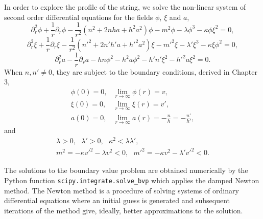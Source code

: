 In order to explore the profile of the string, we solve the non-linear system of second order differential equations for the fields $\phi$, $\xi$ and $a$, 
\begin{equation}
	\partial_r^2 \phi + \frac{1}{r} \partial_r \phi- \frac{1}{r^2}\left(n^2+2nha+h^2a^2\right)\phi- m^2 \phi- \lambda \phi^3-\kappa \phi \xi^2 = 0,
\end{equation}
\begin{equation}
	\partial_r^2 \xi + \frac{1}{r} \partial_r \xi - \frac{1}{r^2}\left(n'^2+2n'h' a+h'^2a^2 \right)\xi -m'^2\xi - \lambda' \xi^3 - \kappa \xi \phi^2 = 0 ,
\end{equation}
\begin{equation}
	\partial_r^2a -\frac{1}{r}\partial_r a-hn\phi^2-h^2a\phi^2-h' n'\xi^2 - h'^2 a \xi^2 = 0.  
\end{equation}
When $n,n'\neq 0$, they are subject to the boundary conditions, derived in Chapter 3,
\begin{eqnarray}
	\phi(0)=0, & \displaystyle\lim_{r\to\infty}\phi(r) = v, \nonumber \\
	 \xi(0)=0, &  \displaystyle\lim_{r\to\infty}\xi(r) = v', \nonumber  \\
	 a(0)=0, & \displaystyle \lim_{r\to\infty}a(r) = -\frac{n}{h}=-\frac{n'}{h'},
\end{eqnarray}
and
\begin{align}
	\label{eq:constraints}
	\lambda>0, \ \ \ \lambda'>0, \ \ \ \kappa^2 < \lambda \lambda',\nonumber \\
	 m^2 = -\kappa v'^2 - \lambda v^2<0,\ \ \ m'^2 = -\kappa v^2 - \lambda' v'^2<0. 
\end{align}

The solutions to the boundary value problem are obtained numerically by the Python function \texttt{scipy.integrate.solve\_bvp} which applies the damped Newton method.
The Newton method is a procedure of solving systems of ordinary differential equations where an initial guess is generated and subsequent iterations of the method give, ideally,  better ap\-prox\-i\-ma\-tions to the solution.

